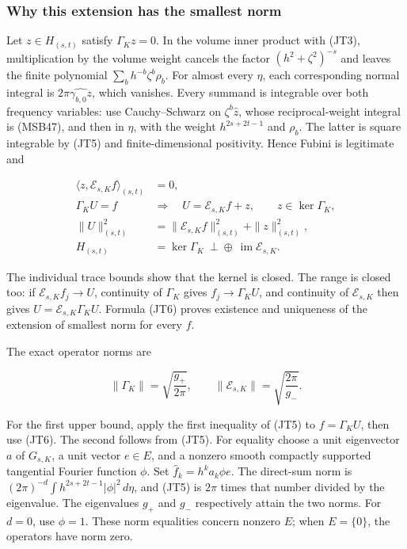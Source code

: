 \documentclass[
  11pt,
]{article}
\begin{document}
\subsubsection{Why this extension has the smallest
norm}\label{why-this-extension-has-the-smallest-norm}

Let \(z\in H_{(s,t)}\) satisfy \(\Gamma_Kz=0\). In the volume inner
product with (JT3), multiplication by the volume weight cancels the
factor \((h^2+\zeta^2)^{-s}\) and leaves the finite polynomial
\(\sum_b h^{-b}\zeta^b\rho_b\). For almost every \(\eta\), each
corresponding normal integral is \(2\pi\widehat{\gamma_{b,0}z}\), which
vanishes. Every summand is integrable over both frequency variables: use
Cauchy--Schwarz on \(\zeta^b\widehat z\), whose reciprocal-weight
integral is (MSB47), and then in \(\eta\), with the weight
\(h^{2s+2t-1}\) and \(\rho_b\). The latter is square integrable by (JT5)
and finite-dimensional positivity. Hence Fubini is legitimate and

\[
 \begin{aligned}
 \langle z,\mathcal E_{s,K}f\rangle_{(s,t)}&=0,\\
 \Gamma_KU=f\quad&\Longrightarrow\quad
 U=\mathcal E_{s,K}f+z,\qquad z\in\ker\Gamma_K,\\
 \|U\|_{(s,t)}^2
 &=\|\mathcal E_{s,K}f\|_{(s,t)}^2+\|z\|_{(s,t)}^2,\\
 H_{(s,t)}&=\ker\Gamma_K\ \mathbin{\perp\!\oplus}\
                 \operatorname{im}\mathcal E_{s,K}.
 \end{aligned}
 \tag{JT6}
\]

The individual trace bounds show that the kernel is closed. The range is
closed too: if \(\mathcal E_{s,K}f_j\to U\), continuity of \(\Gamma_K\)
gives \(f_j\to\Gamma_KU\), and continuity of \(\mathcal E_{s,K}\) then
gives \(U=\mathcal E_{s,K}\Gamma_KU\). Formula (JT6) proves existence
and uniqueness of the extension of smallest norm for every \(f\).

The exact operator norms are

\[
 \|\Gamma_K\|=\sqrt{\frac{g_+}{2\pi}},\qquad
 \|\mathcal E_{s,K}\|=\sqrt{\frac{2\pi}{g_-}}.
 \tag{JT7}
\]

For the first upper bound, apply the first inequality of (JT5) to
\(f=\Gamma_KU\), then use (JT6). The second follows from (JT5). For
equality choose a unit eigenvector \(a\) of \(G_{s,K}\), a unit vector
\(e\in E\), and a nonzero smooth compactly supported tangential Fourier
function \(\phi\). Set \(\widehat f_k=h^k a_k\phi e\). The direct-sum
norm is \((2\pi)^{-d}\int h^{2s+2t-1}|\phi|^2\,d\eta\), and (JT5) is
\(2\pi\) times that number divided by the eigenvalue. The eigenvalues
\(g_+\) and \(g_-\) respectively attain the two norms. For \(d=0\), use
\(\phi=1\). These norm equalities concern nonzero \(E\); when
\(E=\{0\}\), the operators have norm zero.
\end{document}

